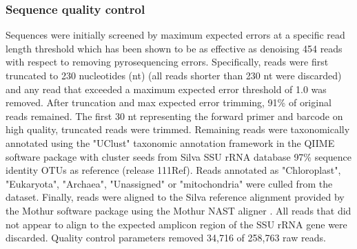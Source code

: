 \subsubsection{Sequence quality control} Sequences were initially screened by
maximum expected errors at a specific read length threshold \citep{23955772}
which has been shown to be as effective as denoising 454 reads with respect to
removing pyrosequencing errors. Specifically, reads were first truncated to 230
nucleotides (nt) (all reads shorter than 230 nt were discarded) and any read that
exceeded a maximum expected error threshold of 1.0 was removed. After
truncation and max
expected error trimming, 91\% of original reads remained. The first 30 nt
representing the forward primer and barcode on high quality, truncated reads
were trimmed. Remaining reads were taxonomically annotated using the "UClust"
taxonomic annotation framework in the QIIME software package \citep{20383131,
20709691} with cluster seeds from Silva SSU rRNA database \citep{17947321} 97\%
sequence identity OTUs as reference (release 111Ref). Reads annotated as
"Chloroplast", "Eukaryota", "Archaea", "Unassigned" or "mitochondria" were
culled from the dataset. Finally, reads were aligned to the Silva reference
alignment provided by the Mothur software package \citep{19801464} using the
Mothur NAST aligner \citep{16845035}. All reads that did not appear to align to
the expected amplicon region of the SSU rRNA gene were discarded. Quality
control parameters removed 34,716 of 258,763 raw reads.

